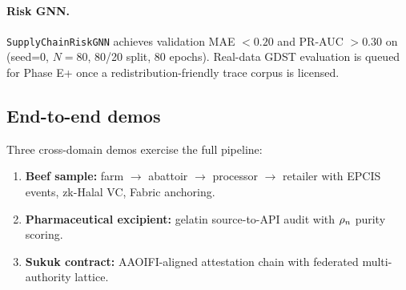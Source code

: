 \paragraph{Risk GNN.}
\texttt{SupplyChainRiskGNN} achieves validation MAE $< 0.20$ and
PR-AUC $> 0.30$ on 
(seed=0, $N{=}80$, 80/20 split, 80 epochs). Real-data GDST
evaluation is queued for Phase E+ once a redistribution-friendly
trace corpus is licensed.

\subsection{End-to-end demos}
Three cross-domain demos exercise the full pipeline:
\begin{enumerate}
  \item \textbf{Beef sample:} farm $\to$ abattoir $\to$ processor
        $\to$ retailer with EPCIS events, zk-Halal VC, Fabric anchoring.
  \item \textbf{Pharmaceutical excipient:} gelatin source-to-API audit
        with $\rho_{n}$ purity scoring.
  \item \textbf{Sukuk contract:} AAOIFI-aligned attestation chain with
        federated multi-authority lattice.
\end{enumerate}

